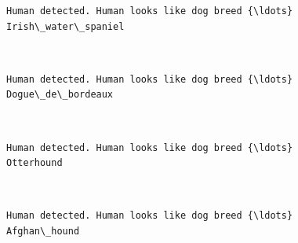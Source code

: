 \documentclass[11pt]{article}
\begin{document}
    \begin{Verbatim}[commandchars=\\\{\}]
Human detected. Human looks like dog breed {\ldots}
Irish\_water\_spaniel

    \end{Verbatim}

    \begin{center}
    \end{center}
    { \hspace*{\fill} \\}
    
    \begin{Verbatim}[commandchars=\\\{\}]
Human detected. Human looks like dog breed {\ldots}
Dogue\_de\_bordeaux

    \end{Verbatim}

    \begin{center}
    \end{center}
    { \hspace*{\fill} \\}
    
    \begin{Verbatim}[commandchars=\\\{\}]
Human detected. Human looks like dog breed {\ldots}
Otterhound

    \end{Verbatim}

    \begin{center}
    \end{center}
    { \hspace*{\fill} \\}
    
    \begin{Verbatim}[commandchars=\\\{\}]
Human detected. Human looks like dog breed {\ldots}
Afghan\_hound

    \end{Verbatim}

    \begin{center}
    \end{center}
    { \hspace*{\fill} \\}
    
\end{document}
